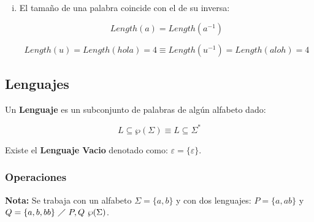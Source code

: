 \begin{enumerate}[I.]
{\begin{enumerate}[i.]

\item El tamaño de una palabra coincide con el de su inversa:

\begin{equation}
Length(a) = Length(a^{-1})
\end{equation}

\ejem

\begin{equation}
Length(u) = Length(hola) = 4 \equiv Length(u^{-1}) = Length(aloh) = 4
\end{equation}

\end{enumerate}

}
\end{enumerate}


\subsection{Lenguajes}

 Un \textbf{Lenguaje} es un subconjunto de palabras de algún alfabeto dado:

\begin{equation}
L \subseteq \wp(\Sigma) \equiv L \subseteq \Sigma^*
\end{equation}

 Existe el \textbf{Lenguaje Vacio} denotado como: $\varepsilon = 
\{\varepsilon\}$.

\subsubsection{Operaciones}

\textbf{Nota:} Se trabaja con un alfabeto $\Sigma = \{a,b\}$ y con dos 
lenguajes:
$P = \{a,ab\}$ y $Q = \{a, b, bb\}\ \diagup\ P,Q\ \wp(\Sigma)$.

